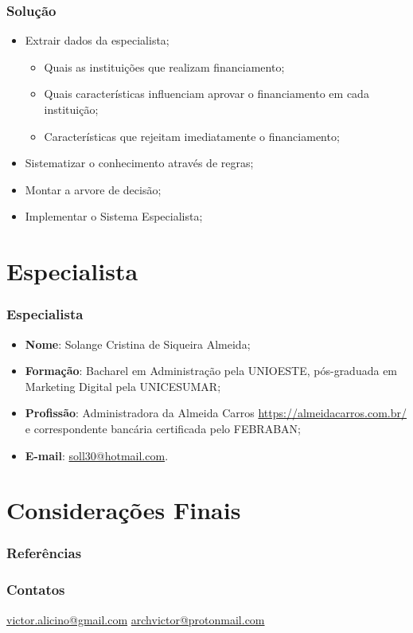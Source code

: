 \documentclass[12pt]{beamer}
\begin{document}
\begin{frame}
    \frametitle{Solução}

    \begin{itemize}
        \item Extrair dados da especialista;
        \begin{itemize}
            \item Quais as instituições que realizam financiamento;
            \item Quais características influenciam aprovar o financiamento em cada instituição;
            \item Características que rejeitam imediatamente o financiamento;
        \end{itemize}
        \item Sistematizar o conhecimento através de regras;
        \item Montar a arvore de decisão;
        \item Implementar o Sistema Especialista;
    \end{itemize}

\end{frame}

\section{Especialista}
\begin{frame}
    \frametitle{Especialista}
    \begin{itemize}
        \item\textbf{Nome}: Solange Cristina de Siqueira Almeida;
        \item\textbf{Formação}: Bacharel em Administração pela UNIOESTE, pós-graduada em Marketing Digital pela UNICESUMAR\@;
        \item\textbf{Profissão}: Administradora da Almeida Carros \url{https://almeidacarros.com.br/} e correspondente bancária certificada pelo FEBRABAN\@;
        \item\textbf{E-mail}: \url{soll30@hotmail.com}.
    \end{itemize}
\end{frame}

\section{Considerações Finais}
\begin{frame}[allowframebreaks]
    \frametitle{Referências}
    
\end{frame}

\begin{frame}
    \frametitle{Contatos}
    \centering
    \url{victor.alicino@gmail.com}
    \url{archvictor@protonmail.com}
\end{frame}
\end{document}
